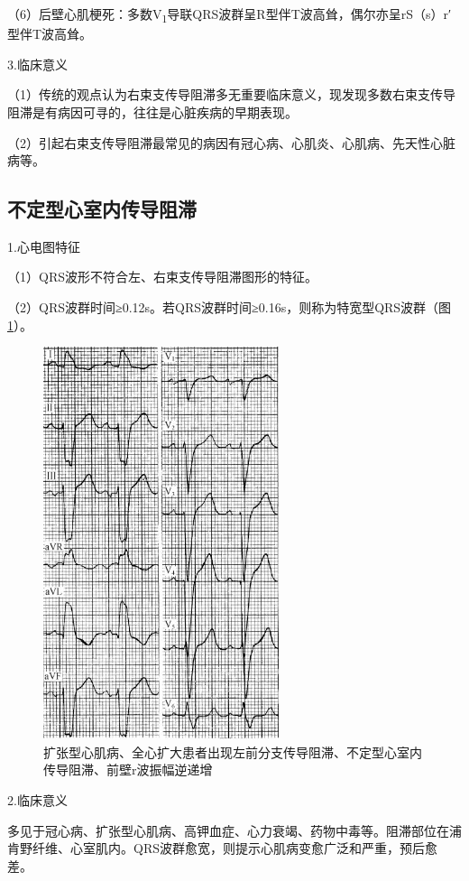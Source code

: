 （6）后壁心肌梗死：多数V\textsubscript{1}导联QRS波群呈R型伴T波高耸，偶尔亦呈rS（s）r′型伴T波高耸。

3.临床意义

（1）传统的观点认为右束支传导阻滞多无重要临床意义，现发现多数右束支传导阻滞是有病因可寻的，往往是心脏疾病的早期表现。

（2）引起右束支传导阻滞最常见的病因有冠心病、心肌炎、心肌病、先天性心脏病等。

\protect\hypertarget{text00009.htmlux5cux23subid57}{}{}

\subsection{不定型心室内传导阻滞}

1.心电图特征

（1）QRS波形不符合左、右束支传导阻滞图形的特征。

（2）QRS波群时间≥0.12s。若QRS波群时间≥0.16s，则称为特宽型QRS波群（图\ref{fig3-13}）。

\begin{figure}[!htbp]
 \centering
 \includegraphics[width=2.71875in,height=4.53125in]{./images/Image00063.jpg}
 \captionsetup{justification=centering}
 \caption{扩张型心肌病、全心扩大患者出现左前分支传导阻滞、不定型心室内传导阻滞、前壁r波振幅逆递增}
 \label{fig3-13}
  \end{figure} 

2.临床意义

多见于冠心病、扩张型心肌病、高钾血症、心力衰竭、药物中毒等。阻滞部位在浦肯野纤维、心室肌内。QRS波群愈宽，则提示心肌病变愈广泛和严重，预后愈差。

